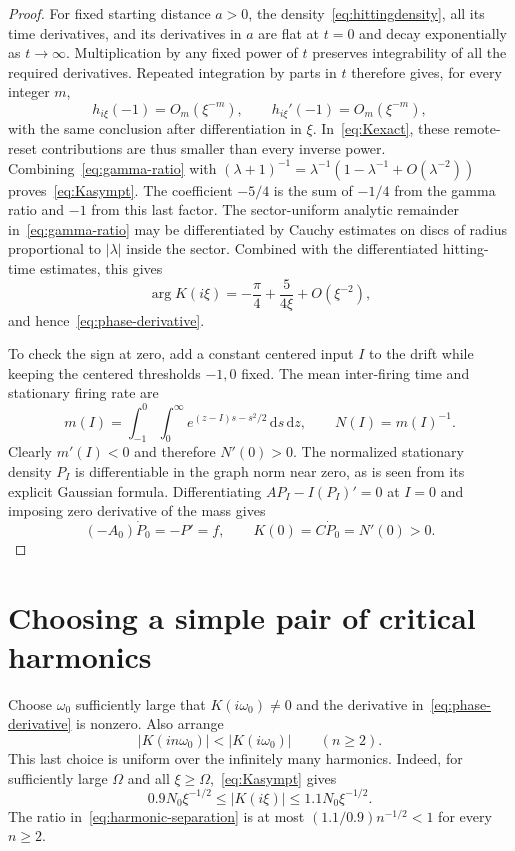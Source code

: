 \documentclass[11pt,a4paper]{article}
\numberwithin{equation}{section}
\theoremstyle{remark}\newtheorem{remark}[theorem]{Remark}
\newcommand{\dd}{\,\mathrm d}
\begin{document}
\begin{proof}
For fixed starting distance $a>0$, the density~\eqref{eq:hittingdensity}, all its time derivatives, and its derivatives in $a$ are flat at $t=0$ and decay exponentially as $t\to\infty$. Multiplication by any fixed power of $t$ preserves integrability of all the required derivatives. Repeated integration by parts in $t$ therefore gives, for every integer $m$,
\[
 h_{i\xi}(-1)=O_m(\xi^{-m}),\qquad
 h_{i\xi}'(-1)=O_m(\xi^{-m}),
\]
with the same conclusion after differentiation in $\xi$. In~\eqref{eq:Kexact}, these remote-reset contributions are thus smaller than every inverse power. Combining~\eqref{eq:gamma-ratio} with
$(\lambda+1)^{-1}=\lambda^{-1}(1-\lambda^{-1}+O(\lambda^{-2}))$
proves~\eqref{eq:Kasympt}. The coefficient $-5/4$ is the sum of $-1/4$ from the gamma ratio and $-1$ from this last factor. The sector-uniform analytic remainder in~\eqref{eq:gamma-ratio} may be differentiated by Cauchy estimates on discs of radius proportional to $|\lambda|$ inside the sector. Combined with the differentiated hitting-time estimates, this gives
\[
 \arg K(i\xi)=-\frac\pi4+\frac5{4\xi}+O(\xi^{-2}),
\]
and hence~\eqref{eq:phase-derivative}.

To check the sign at zero, add a constant centered input $I$ to the drift while keeping the centered thresholds $-1,0$ fixed. The mean inter-firing time and stationary firing rate are
\[
 m(I)=\int_{-1}^0\int_0^\infty e^{(z-I)s-s^2/2}\dd s\dd z,
 \qquad N(I)=m(I)^{-1}.
\]
Clearly $m'(I)<0$ and therefore $N'(0)>0$. The normalized stationary density $P_I$ is differentiable in the graph norm near zero, as is seen from its explicit Gaussian formula. Differentiating $AP_I-I(P_I)'=0$ at $I=0$ and imposing zero derivative of the mass gives
\[
 (-A_0)\dot P_0=-P'=f,
 \qquad K(0)=C\dot P_0=N'(0)>0.
\]
\end{proof}

\section{Choosing a simple pair of critical harmonics}
Choose $\omega_0$ sufficiently large that $K(i\omega_0)\ne0$ and the derivative in~\eqref{eq:phase-derivative} is nonzero. Also arrange
\begin{equation}\label{eq:harmonic-separation}
 |K(in\omega_0)|<|K(i\omega_0)|\qquad(n\geq2).
\end{equation}
This last choice is uniform over the infinitely many harmonics. Indeed, for sufficiently large $\Omega$ and all $\xi\geq\Omega$,~\eqref{eq:Kasympt} gives
\[
 0.9N_0\xi^{-1/2}\leq|K(i\xi)|\leq1.1N_0\xi^{-1/2}.
\]
The ratio in~\eqref{eq:harmonic-separation} is at most
$(1.1/0.9)n^{-1/2}<1$ for every $n\geq2$.
\end{document}
